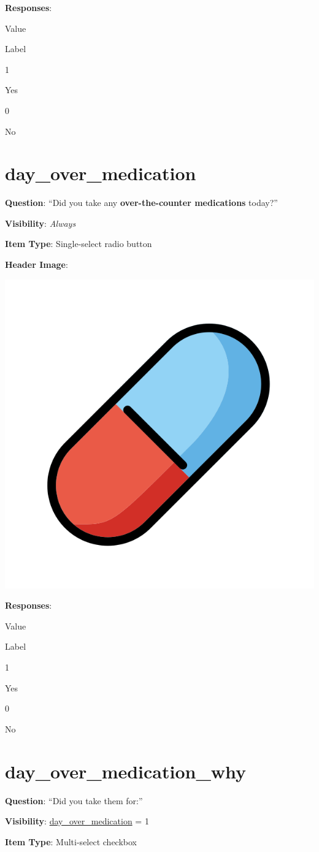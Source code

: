 \documentclass[]{book}
\begin{document}
\textbf{Responses}:

Value

Label

1

Yes

0

No

\hypertarget{day_over_medication}{%
\section{day\_over\_medication}\label{day_over_medication}}

\textbf{Question}: ``Did you take any \textbf{over-the-counter medications} today?''

\textbf{Visibility}: \emph{Always}

\textbf{Item Type}: Single-select radio button

\textbf{Header Image}:

\begin{flushleft}\includegraphics[width=0.33\linewidth]{downloadFigs4latex_NIMH_Applet_Codebook/day_over_medication_headerImg} \end{flushleft}

\textbf{Responses}:

Value

Label

1

Yes

0

No

\hypertarget{day_over_medication_why}{%
\section{day\_over\_medication\_why}\label{day_over_medication_why}}

\textbf{Question}: ``Did you take them for:''

\textbf{Visibility}: \protect\hyperlink{day_over_medication}{day\_over\_medication} = 1

\textbf{Item Type}: Multi-select checkbox
\end{document}
